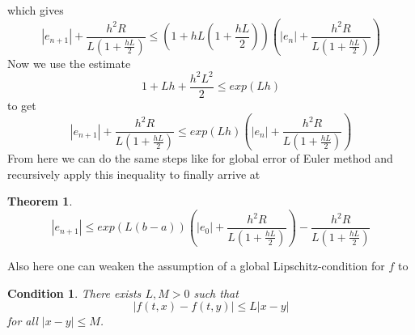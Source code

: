 \documentclass[17pt]{extarticle}
\newtheorem*{theorem*}{Theorem}
\newtheorem*{condition*}{Condition}
\begin{document}
	which gives
	$$
	|e_{n+1}|+\frac{h^2R}{L\left(1+\frac{hL}{2}\right)}\leq \left(1+hL\left(1+\frac{hL}{2}\right)\right)\left(|e_n|+\frac{h^2R}{L\left(1+\frac{hL}{2}\right)}\right)
	$$
	Now we use the estimate 
	$$
	1+Lh+\frac{h^2L^2}{2}\leq exp(Lh)
	$$
	to get	
	\begin{equation*}
		|e_{n+1}|+\frac{h^2R}{L\left(1+\frac{hL}{2}\right)}\leq exp(Lh)\left(|e_n|+\frac{h^2R}{L\left(1+\frac{hL}{2}\right)}\right)
	\end{equation*}
From here we can do the same steps like for global error of Euler method and recursively apply this inequality to finally arrive at
	\begin{theorem*}
		$$
		|e_{n+1}|\leq exp(L(b-a))\left(|e_{0}|+\frac{h^2R}{L\left(1+\frac{hL}{2}\right)}\right)-\frac{h^2R}{L\left(1+\frac{hL}{2}\right)}
		$$
	\end{theorem*}
	Also here one can weaken the assumption of a global Lipschitz-condition for $f$ to  
	\begin{condition*}
		There exists $L, M>0$ such that
		\begin{equation*} 
			|f(t, x)-f(t,y)|\leq L|x-y|
		\end{equation*}
		for all $|x-y|\leq M$.
	\end{condition*}
\end{document}
